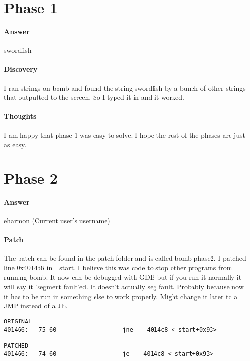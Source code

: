 \documentclass[12pt]{article}
\begin{document}
\maketitle

\section{Phase 1}
\paragraph{Answer}
swordfish

\paragraph{Discovery}
I ran strings on bomb and found the string swordfish by a bunch of other strings that outputted to the screen. So I typed it in and it worked.

\paragraph{Thoughts}
I am happy that phase 1 was easy to solve. I hope the rest of the phases are just as easy.

\section{Phase 2}
\paragraph{Answer}
eharmon (Current user's username)

\paragraph{Patch}
The patch can be found in the patch folder and is called bomb-phase2. I patched line 0x401466 in \_start. I believe this was code to stop other programs from running bomb. It now can be debugged with GDB but if you run it normally it will say it 'segment fault'ed. It doesn't actually seg fault. Probably because now it has to be run in something else to work properly. Might change it later to a JMP instead of a JE.

\begin{verbatim}
ORIGINAL
401466:   75 60                   jne    4014c8 <_start+0x93>

PATCHED
401466:   74 60                   je    4014c8 <_start+0x93>
\end{verbatim}
\end{document}
